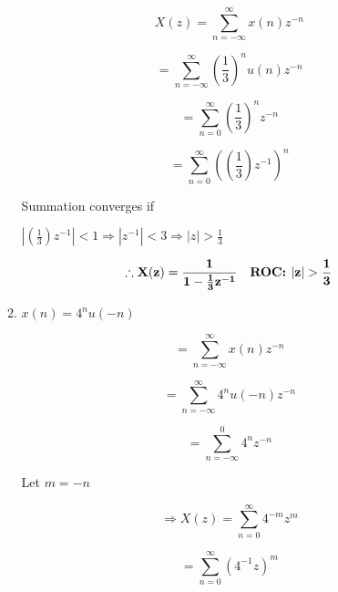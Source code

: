 \documentclass[fleqn]{article}
\begin{document}
\begin{enumerate}[nolistsep]
\begin{enumerate}[nolistsep]
					\begin{equation*}
						X(z) = \sum_{n=-\infty}^{\infty}x(n)z^{-n}
					\end{equation*}
					
					\begin{equation*}
						= \sum_{n=-\infty}^{\infty}\left(\frac{1}{3}\right)^{n}u(n)z^{-n}
					\end{equation*}
					
					\begin{equation*}
						= \sum_{n=0}^{\infty}\left(\frac{1}{3}\right)^{n}z^{-n}
					\end{equation*}
					
					\begin{equation*}
						= \sum_{n=0}^{\infty}\left(\left(\frac{1}{3}\right)z^{-1}\right)^{n}
					\end{equation*}
					
					Summation converges if
					
					$\left|\left(\frac{1}{3}\right)z^{-1}\right| < 1 \Rightarrow |z^{-1}| < 3 \Rightarrow |z| > \frac{1}{3}$
					
					\begin{equation*}
						\mathbf{\therefore X(z) = \frac{1}{1 - \frac{1}{3}z^{-1}} \quad \text{\textbf{ROC: }} |z| > \frac{1}{3}}
					\end{equation*}
					
				\pagebreak
				\item $x(n) = 4^{n}u(-n)$
				
					\begin{equation*}
						= \sum_{n=-\infty}^{\infty}x(n)z^{-n}
					\end{equation*}
					
					\begin{equation*}
						= \sum_{n=-\infty}^{\infty}4^{n}u(-n)z^{-n}
					\end{equation*}
					
					\begin{equation*}
						= \sum_{n=-\infty}^{0}4^{n}z^{-n}
					\end{equation*}
					
					Let $m = -n$
					
					\begin{equation*}
						\Rightarrow X(z) = \sum_{n=0}^{\infty}4^{-m}z^{m}
					\end{equation*}
					
					\begin{equation*}
						= \sum_{n=0}^{\infty}(4^{-1}z)^{m}
					\end{equation*}
					

\end{enumerate}
\end{enumerate}
\end{document}
